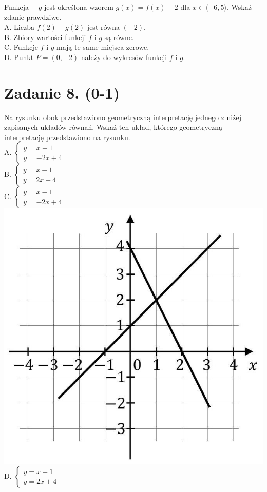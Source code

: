 \documentclass[10pt]{article}
\begin{document}
Funkcja \(\quad g\) jest określona wzorem \(g(x)=f(x)-2\) dla \(x \in\langle-6,5\rangle\). Wskaż zdanie prawdziwe.\\
A. Liczba \(f(2)+g(2)\) jest równa \((-2)\).\\
B. Zbiory wartości funkcji \(f\) i \(g\) są równe.\\
C. Funkcje \(f\) i \(g\) mają te same miejsca zerowe.\\
D. Punkt \(P=(0,-2)\) należy do wykresów funkcji \(f\) i \(g\).

\section*{Zadanie 8. (0-1)}
Na rysunku obok przedstawiono geometryczną interpretację jednego z niżej zapisanych układów równań. Wskaż ten układ, którego geometryczną interpretację przedstawiono na rysunku.\\
A. \(\left\{\begin{array}{l}y=x+1 \\ y=-2 x+4\end{array}\right.\)\\
B. \(\left\{\begin{array}{l}y=x-1 \\ y=2 x+4\end{array}\right.\)\\
C. \(\left\{\begin{array}{l}y=x-1 \\ y=-2 x+4\end{array}\right.\)\\
\includegraphics[max width=\textwidth, center]{2024_11_21_46d945490f1b2eff1c8eg-04}\\
D. \(\left\{\begin{array}{l}y=x+1 \\ y=2 x+4\end{array}\right.\)
\end{document}
